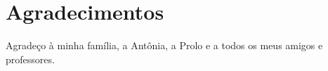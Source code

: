 
\chapter*{Agradecimentos}

Agradeço à minha família, a Antônia, a Prolo e a todos os meus amigos e professores.
